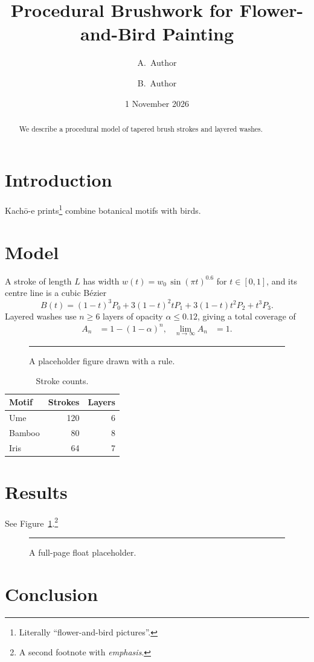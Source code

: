 \documentclass[11pt]{article}
\title{Procedural Brushwork for Flower-and-Bird Painting}
\author{A.~Author \and B.~Author}
\date{1 November 2026}
\begin{document}
\maketitle
\begin{abstract}
We describe a procedural model of tapered brush strokes and layered washes.
\lipsum[1][1-4]
\end{abstract}
\section{Introduction}
Kach\=o-e prints\footnote{Literally ``flower-and-bird pictures''.} combine
botanical motifs with birds. \lipsum[2]
\section{Model}
A stroke of length $L$ has width $w(t)=w_0\,\sin(\pi t)^{0.6}$ for
$t\in[0,1]$, and its centre line is a cubic B\'ezier
\begin{equation}
  B(t)=(1-t)^3P_0+3(1-t)^2tP_1+3(1-t)t^2P_2+t^3P_3 .
\end{equation}
Layered washes use $n\ge 6$ layers of opacity $\alpha\le 0.12$, giving a
total coverage of
\begin{align}
  A_n &= 1-(1-\alpha)^n, & \lim_{n\to\infty} A_n &= 1.
\end{align}
\lipsum[3]
\begin{figure}[t]
  \centering
  \rule{0.8\linewidth}{4cm}
  \caption{A placeholder figure drawn with a rule.}\label{fig:a}
\end{figure}
\begin{table}[h]
  \centering
  \begin{tabular}{lrr}\hline
  Motif & Strokes & Layers\\\hline
  Ume & 120 & 6\\ Bamboo & 80 & 8\\ Iris & 64 & 7\\\hline
  \end{tabular}
  \caption{Stroke counts.}
\end{table}
\section{Results}
See Figure~\ref{fig:a}.\footnote{A second footnote with \emph{emphasis}.}
\lipsum[4-7]
\begin{figure}[p]
  \centering
  \rule{0.9\linewidth}{0.5\textheight}
  \caption{A full-page float placeholder.}
\end{figure}
\section{Conclusion}
\lipsum[8-10]
\end{document}
